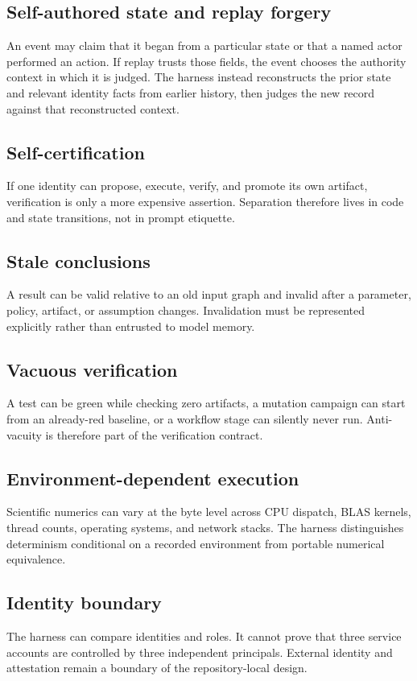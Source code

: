 \subsection{Self-authored state and replay forgery}
An event may claim that it began from a particular state or that a named actor performed an action. If replay trusts those fields, the event chooses the authority context in which it is judged. The harness instead reconstructs the prior state and relevant identity facts from earlier history, then judges the new record against that reconstructed context.

\subsection{Self-certification}
If one identity can propose, execute, verify, and promote its own artifact, verification is only a more expensive assertion. Separation therefore lives in code and state transitions, not in prompt etiquette.

\subsection{Stale conclusions}
A result can be valid relative to an old input graph and invalid after a parameter, policy, artifact, or assumption changes. Invalidation must be represented explicitly rather than entrusted to model memory.

\subsection{Vacuous verification}
A test can be green while checking zero artifacts, a mutation campaign can start from an already-red baseline, or a workflow stage can silently never run. Anti-vacuity is therefore part of the verification contract.

\subsection{Environment-dependent execution}
Scientific numerics can vary at the byte level across CPU dispatch, BLAS kernels, thread counts, operating systems, and network stacks. The harness distinguishes determinism conditional on a recorded environment from portable numerical equivalence.

\subsection{Identity boundary}
The harness can compare identities and roles. It cannot prove that three service accounts are controlled by three independent principals. External identity and attestation remain a boundary of the repository-local design.

